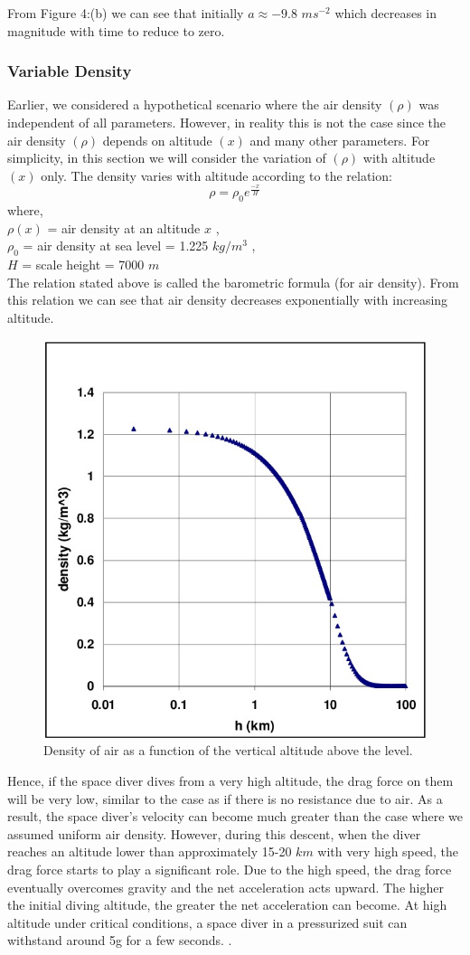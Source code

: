 \documentclass[a4paper, 14pt]{extarticle}
\begin{document}
From Figure 4:(b) we can see that initially $a \approx-\text{9.8 }ms^{-2}$ which decreases in magnitude with time to reduce to zero.
\subsubsection {Variable Density}
Earlier, we considered a hypothetical scenario where the air density $(\rho)$ was independent of all parameters. However, in reality this is not the case since the air density $(\rho)$ depends on altitude $(x)$ and many other parameters. For simplicity, in this section we will consider the variation of $(\rho)$ with altitude $(x)$ only.  The density varies with altitude according to the relation:
$$\rho = \rho_0  e^{\frac{-x}{H}} $$ where,\\
$\rho(x)$ = air density at an altitude $x$ ,\\
$\rho_0$ = air density at sea level = 1.225 $kg/m^3$ ,\\
$H$ = scale height = 7000 $m$\\
The relation stated above is called the barometric formula (for air density)\citep{wiki-barometric-formula}. From this relation we can see that air density decreases exponentially with increasing altitude.
\begin{figure}[H]
\centering
\includegraphics[width=0.5\linewidth]{rho-variation.jpeg}
\caption{\label{fig:rho-variation}Density of air as a function of the vertical altitude above the level. \citep{anchordoqui2000air}}
\end{figure}
Hence, if the space diver dives from a very high altitude, the drag force on them will be very low, similar to the case as if there is no resistance due to air. As a result, the space diver's velocity can become much greater than the case where we assumed uniform air density. However, during this descent, when the diver reaches an altitude lower than approximately 15-20 $km$ with very high speed, the drag force starts to play a significant role. Due to the high speed, the drag force eventually overcomes gravity and the net acceleration acts upward. The higher the initial diving altitude, the greater the net acceleration can become. At high altitude under critical conditions, a space diver in a pressurized suit can withstand around 5g for a few seconds. \citep{park2015unpredictability}.
\end{document}
